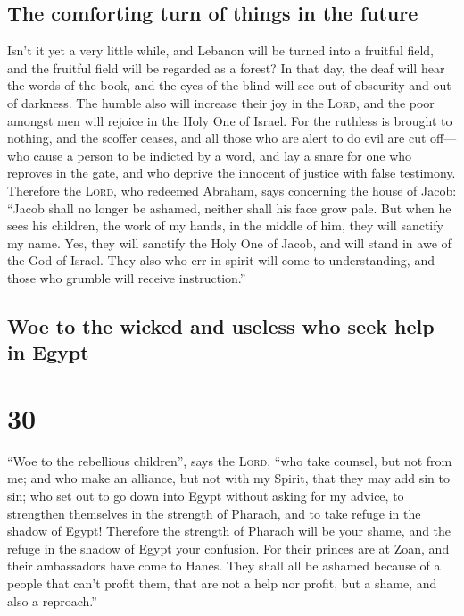 \hypertarget{the-comforting-turn-of-things-in-the-future}{%
\subsection{The comforting turn of things in the
future}\label{the-comforting-turn-of-things-in-the-future}}

 Isn't it yet a very little while, and Lebanon will be
turned into a fruitful field, and the fruitful field will be regarded as
a forest?  In that day, the deaf will hear the words of
the book, and the eyes of the blind will see out of obscurity and out of
darkness.  The humble also will increase their joy in the
\textsc{Lord}, and the poor amongst men will rejoice in the Holy One of
Israel.  For the ruthless is brought to nothing, and the
scoffer ceases, and all those who are alert to do evil are cut off---
 who cause a person to be indicted by a word, and lay a
snare for one who reproves in the gate, and who deprive the innocent of
justice with false testimony.  Therefore the
\textsc{Lord}, who redeemed Abraham, says concerning the house of Jacob:
``Jacob shall no longer be ashamed, neither shall his face grow pale.
 But when he sees his children, the work of my hands, in
the middle of him, they will sanctify my name. Yes, they will sanctify
the Holy One of Jacob, and will stand in awe of the God of Israel.
 They also who err in spirit will come to understanding,
and those who grumble will receive instruction.''

\hypertarget{woe-to-the-wicked-and-useless-who-seek-help-in-egypt}{%
\subsection{Woe to the wicked and useless who seek help in
Egypt}\label{woe-to-the-wicked-and-useless-who-seek-help-in-egypt}}

\hypertarget{section-29}{%
\section{30}\label{section-29}}

 ``Woe to the rebellious children'', says the
\textsc{Lord}, ``who take counsel, but not from me; and who make an
alliance, but not with my Spirit, that they may add sin to sin;
 who set out to go down into Egypt without asking for my
advice, to strengthen themselves in the strength of Pharaoh, and to take
refuge in the shadow of Egypt!  Therefore the strength of
Pharaoh will be your shame, and the refuge in the shadow of Egypt your
confusion.  For their princes are at Zoan, and their
ambassadors have come to Hanes.  They shall all be ashamed
because of a people that can't profit them, that are not a help nor
profit, but a shame, and also a reproach.''

